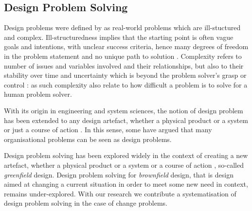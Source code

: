 \documentclass[runningheads,a4paper]{llncs}
\begin{document}
\subsection{Design Problem Solving}\label{design}

Design problems were defined by \cite{jonassen2000toward} as real-world problems which are ill-stuctured and complex. Ill-structuredness implies that the starting point is often vague goals and intentions, with unclear success criteria, hence many degrees of freedom in the problem statement and no unique path to solution \cite{simon1977structure}%
. Complexity refers to number of issues and variables involved and their relationships, but also to their stability over time and uncertainty which is beyond the problem solver's grasp or control \cite{funke1991solving}%
: as such complexity also relate to how difficult a problem is to solve for a human problem solver.

With its origin in engineering and system sciences, the notion of design problem has been extended to any design artefact, whether a physical product or a system or just a course of action \cite{smith1993conceptual}. In this sense, some have argued that many organisational problems \cite{martin2009design,leavy2010design} can be seen as design problems. 

Design problem solving \cite{smith1993conceptual}  has been explored widely in the context of creating a new artefact, whether a physical product or a system or a course of action \cite{smith1993conceptual}, so-called {\it greenfield} design. Design problem solving for {\it brownfield} design, that is design aimed at changing a current situation in order to meet some new need in context, remains under-explored. With our research we contribute a systematisation of design problem solving in the case of change problems. 
\end{document}
